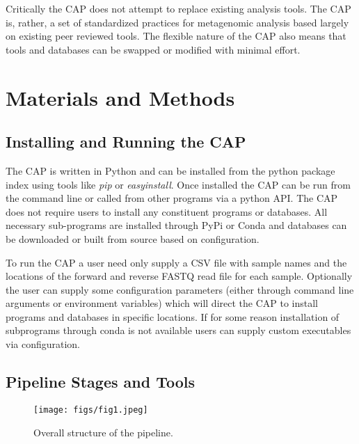 Critically the CAP does not attempt to replace existing analysis tools. The CAP is, rather, a set of standardized practices for metagenomic analysis based largely on existing peer reviewed tools. The flexible nature of the CAP also means that tools and databases can be swapped or modified with minimal effort.

\section{Materials and Methods}

\subsection{Installing and Running the CAP}

The CAP is written in Python and can be installed from the python package index using tools like \textit{pip} or \textit{easyinstall}. Once installed the CAP can be run from the command line or called from other programs via a python API. The CAP does not require users to install any constituent programs or databases. All necessary sub-programs are installed through PyPi or Conda and databases can be downloaded or built from source based on configuration. 

To run the CAP a user need only supply a CSV file with sample names and the locations of the forward and reverse FASTQ read file for each sample. Optionally the user can supply some configuration parameters (either through command line arguments or environment variables) which will direct the CAP to install programs and databases in specific locations. If for some reason installation of subprograms through conda is not available users can supply custom executables via configuration.

\subsection{Pipeline Stages and Tools}

\begin{figure}
  \begin{center}
    \texttt{[image: figs/fig1.jpeg]}
	\caption{\small{
	    Overall structure of the pipeline. 
	}}
    \label{fig:pipe}
  \end{center}
\end{figure}


